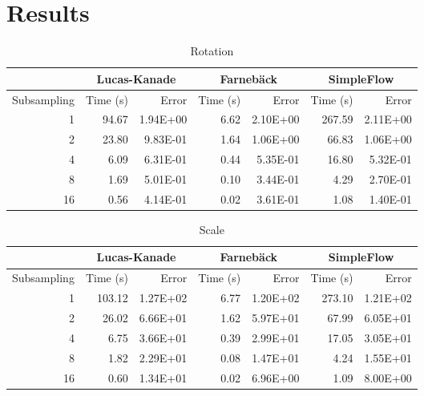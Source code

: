 \chapter{Results}
\label{sec:appendix3}

\ifpdf
  \graphicspath{{Appendix3/Figs/Raster/}{Appendix3/Figs/PDF/}{Appendix3/Figs/}}
\else
  \graphicspath{{Appendix3/Figs/Vector/}{Appendix3/Figs/}}
\fi

\begin{table}[htbp]
  \centering
  \begin{tabular}{r|rr|rr|rr}
    \toprule
    & \multicolumn{2}{c}{Lucas-Kanade} & \multicolumn{2}{c}{Farnebäck} & \multicolumn{2}{c}{SimpleFlow} \\
    \midrule
    Subsampling & Time (s) & Error & Time (s) & Error & Time (s) & Error \\
    \midrule
    1     & 94.67 & 1.94E+00 & 6.62  & 2.10E+00 & 267.59 & 2.11E+00 \\
    2     & 23.80 & 9.83E-01 & 1.64  & 1.06E+00 & 66.83 & 1.06E+00 \\
    4     & 6.09  & 6.31E-01 & 0.44  & 5.35E-01 & 16.80 & 5.32E-01 \\
    8     & 1.69  & 5.01E-01 & 0.10  & 3.44E-01 & 4.29  & 2.70E-01 \\
    16    & 0.56  & 4.14E-01 & 0.02  & 3.61E-01 & 1.08  & 1.40E-01 \\
    \bottomrule
  \end{tabular}
  \caption{Rotation}
  \label{tab:rotation}
\end{table}

\begin{table}[htbp]
  \centering
  \begin{tabular}{r|rr|rr|rr}
    \toprule
    & \multicolumn{2}{c}{Lucas-Kanade} & \multicolumn{2}{c}{Farnebäck} & \multicolumn{2}{c}{SimpleFlow} \\
    \midrule
    Subsampling & Time (s) & Error & Time (s) & Error & Time (s) & Error \\
    \midrule
    1 & 103.12 & 1.27E+02 & 6.77  & 1.20E+02 & 273.10 & 1.21E+02 \\
    2 & 26.02 & 6.66E+01 & 1.62  & 5.97E+01 & 67.99 & 6.05E+01 \\
    4 & 6.75  & 3.66E+01 & 0.39  & 2.99E+01 & 17.05 & 3.05E+01 \\
    8 & 1.82  & 2.29E+01 & 0.08  & 1.47E+01 & 4.24  & 1.55E+01 \\
    16 & 0.60  & 1.34E+01 & 0.02  & 6.96E+00 & 1.09  & 8.00E+00 \\
    \bottomrule
  \end{tabular}
  \caption{Scale}
  \label{tab:scale}
\end{table}

